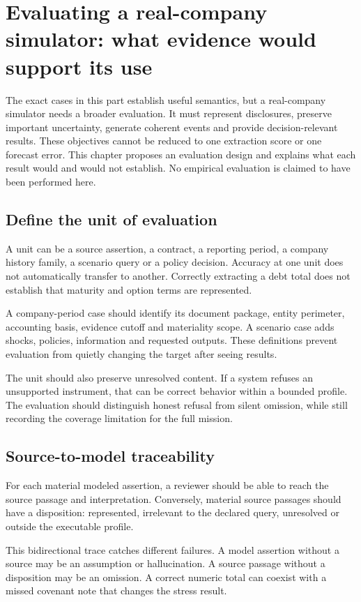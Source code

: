 \chapter[Evaluating a real-company simulator]{Evaluating a real-company simulator: what evidence would support its use}
\label{sim:evaluation}

The exact cases in this part establish useful semantics, but a real-company simulator needs a broader evaluation. It must represent disclosures, preserve important uncertainty, generate coherent events and provide decision-relevant results. These objectives cannot be reduced to one extraction score or one forecast error. This chapter proposes an evaluation design and explains what each result would and would not establish. No empirical evaluation is claimed to have been performed here.

\section{Define the unit of evaluation}
A unit can be a source assertion, a contract, a reporting period, a company history family, a scenario query or a policy decision. Accuracy at one unit does not automatically transfer to another. Correctly extracting a debt total does not establish that maturity and option terms are represented.

A company-period case should identify its document package, entity perimeter, accounting basis, evidence cutoff and materiality scope. A scenario case adds shocks, policies, information and requested outputs. These definitions prevent evaluation from quietly changing the target after seeing results.

The unit should also preserve unresolved content. If a system refuses an unsupported instrument, that can be correct behavior within a bounded profile. The evaluation should distinguish honest refusal from silent omission, while still recording the coverage limitation for the full mission.

\section{Source-to-model traceability}
For each material modeled assertion, a reviewer should be able to reach the source passage and interpretation. Conversely, material source passages should have a disposition: represented, irrelevant to the declared query, unresolved or outside the executable profile.

This bidirectional trace catches different failures. A model assertion without a source may be an assumption or hallucination. A source passage without a disposition may be an omission. A correct numeric total can coexist with a missed covenant note that changes the stress result.

